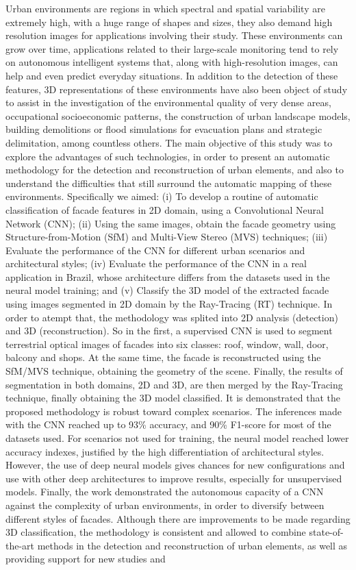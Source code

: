 \begin{resumo}
Urban environments are regions in which spectral and spatial variability are extremely high, with a huge range of shapes and sizes, they also demand high resolution images for applications involving their study. These environments can grow over time, applications related to their large-scale monitoring tend to rely on autonomous intelligent systems that, along with high-resolution images, can help and even predict everyday situations. In addition to the detection of these features, 3D representations of these environments have also been object of study to assist in the investigation of the environmental quality of very dense areas, occupational socioeconomic patterns, the construction of urban landscape models, building demolitions or flood simulations for evacuation plans and strategic delimitation, among countless others. The main objective of this study was to explore the advantages of such technologies, in order to present an automatic methodology for the detection and reconstruction of urban elements, and also to understand the difficulties that still surround the automatic mapping of these environments. Specifically we aimed: (i) To develop a routine of automatic classification of facade features in 2D domain, using a Convolutional Neural Network (CNN); (ii) Using the same images, obtain the facade geometry using Structure-from-Motion (SfM) and Multi-View Stereo (MVS) techniques; (iii) Evaluate the performance of the CNN for different urban scenarios and architectural styles; (iv) Evaluate the performance of the CNN in a real application in Brazil, whose architecture differs from the datasets used in the neural model training; and (v) Classify the 3D model of the extracted facade using images segmented in 2D domain by the Ray-Tracing (RT) technique. In order to atempt that, the methodology was splited into 2D analysis (detection) and 3D (reconstruction). So in the first, a supervised CNN is used to segment terrestrial optical images of facades into six classes: roof, window, wall, door, balcony and shops. At the same time, the facade is reconstructed using the SfM/MVS technique, obtaining the geometry of the scene. Finally, the results of segmentation in both domains, 2D and 3D, are then merged by the Ray-Tracing technique, finally obtaining the 3D model classified. It is demonstrated that the proposed methodology is robust toward complex scenarios. The inferences made with the CNN reached up to 93\% accuracy, and 90\% F1-score for most of the datasets used. For scenarios not used for training, the neural model reached lower accuracy indexes, justified by the high differentiation of architectural styles. However, the use of deep neural models gives chances for new configurations and use with other deep architectures to improve results, especially for unsupervised models. Finally, the work demonstrated the autonomous capacity of a CNN against the complexity of urban environments, in order to diversify between different styles of facades. Although there are improvements to be made regarding 3D classification, the methodology is consistent and allowed to combine state-of-the-art methods in the detection and reconstruction of urban elements, as well as providing support for new studies and 
\end{resumo}
